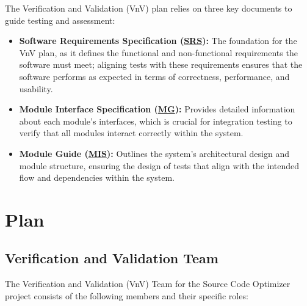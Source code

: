\documentclass[12pt, titlepage]{article}
\newcommand{\SRS}{\href{https://github.com/ssm-lab/capstone--source-code-optimizer/blob/main/docs/SRS/SRS.pdf}{SRS}}
\newcommand{\MG}{\href{https://github.com/ssm-lab/capstone--source-code-optimizer/blob/main/docs/Design/SoftArchitecture/MG.pdf}{MG}}
\newcommand{\MIS}{\href{https://github.com/ssm-lab/capstone--source-code-optimizer/blob/main/docs/Design/SoftDetailedDes/MIS.pdf}{MIS}}
\begin{document}
The Verification and Validation (VnV) plan relies on three key documents to guide testing and assessment: 
\begin{itemize}
  \item[] \textbf{Software Requirements Specification (\SRS)\cite{SRS}:} The foundation for the VnV plan, as it defines the functional and non-functional requirements the software must meet; aligning tests with these requirements ensures that the software performs as expected in terms of correctness, performance, and usability.
  
  \item[] \textbf{Module Interface Specification (\MG)\cite{MGDoc}:} Provides detailed information about each module's interfaces, which is crucial for integration testing to verify that all modules interact correctly within the system.
  
  \item[] \textbf{Module Guide (\MIS)\cite{MISDoc}:} Outlines the system's architectural design and module structure, ensuring the design of tests that align with the intended flow and dependencies within the system.
\end{itemize}

\section{Plan}


\subsection{Verification and Validation Team}

The Verification and Validation (VnV) Team for the Source Code Optimizer project consists of the following members and their specific roles:
\end{document}
